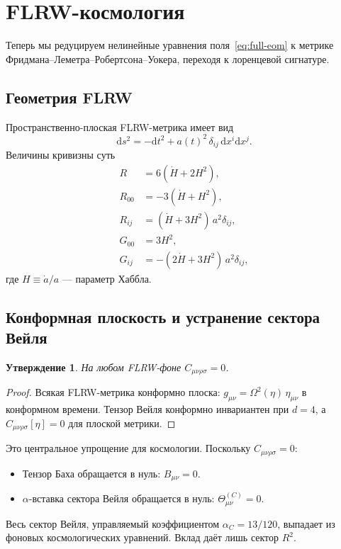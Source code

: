\documentclass[12pt,a4paper]{article}
\newcommand{\dd}{\mathrm{d}}
\theoremstyle{plain}
\newtheorem{proposition}[theorem]{Утверждение}
\theoremstyle{definition}
\begin{document}
\section{FLRW-космология}
\label{sec:flrw}

Теперь мы редуцируем нелинейные уравнения поля~\eqref{eq:full-eom} к
метрике Фридмана--Леметра--Робертсона--Уокера, переходя к лоренцевой
сигнатуре.

\subsection{Геометрия FLRW}

Пространственно-плоская FLRW-метрика имеет вид
\begin{equation}\label{eq:flrw-metric}
  \dd s^2 = -\dd t^2 + a(t)^2\,\delta_{ij}\,\dd x^i\dd x^j.
\end{equation}
Величины кривизны суть
\begin{align}
  R &= 6(\dot{H} + 2H^2), \label{eq:R-FLRW}\\
  R_{00} &= -3(\dot{H} + H^2), \label{eq:R00-FLRW}\\
  R_{ij} &= (\dot{H} + 3H^2)\,a^2\delta_{ij}, \label{eq:Rij-FLRW}\\
  G_{00} &= 3H^2, \label{eq:G00-FLRW}\\
  G_{ij} &= -(2\dot{H} + 3H^2)\,a^2\delta_{ij}, \label{eq:Gij-FLRW}
\end{align}
где $H \equiv \dot{a}/a$ --- параметр Хаббла.

\subsection{Конформная плоскость и устранение сектора Вейля}

\begin{proposition}
\label{prop:weyl-flrw}
На любом FLRW-фоне $C_{\mu\nu\rho\sigma} = 0$.
\end{proposition}

\begin{proof}
Всякая FLRW-метрика конформно плоска:
$g_{\mu\nu} = \Omega^2(\eta)\,\eta_{\mu\nu}$ в конформном времени.
Тензор Вейля конформно инвариантен при $d = 4$, а
$C_{\mu\nu\rho\sigma}[\eta] = 0$ для плоской метрики.
\end{proof}

Это центральное упрощение для космологии.  Поскольку
$C_{\mu\nu\rho\sigma} = 0$:
\begin{itemize}[nosep]
  \item Тензор Баха обращается в нуль: $B_{\mu\nu} = 0$.
  \item $\alpha$-вставка сектора Вейля обращается в нуль:
    $\Theta^{(C)}_{\mu\nu} = 0$.
\end{itemize}
Весь сектор Вейля, управляемый коэффициентом $\alpha_C = 13/120$,
выпадает из фоновых космологических уравнений.  Вклад даёт лишь сектор
$R^2$.
\end{document}
